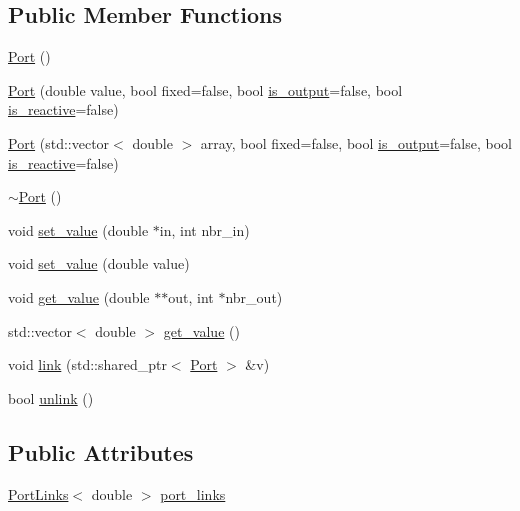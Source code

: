 \subsection*{Public Member Functions}
\begin{DoxyCompactItemize}
\item 
\hyperlink{class_port_a2cfb70a4b6d730e715042d646ec1d960}{Port} ()
\item 
\hyperlink{class_port_abc59e965682f281264a8488a46408a6f}{Port} (double value, bool fixed=false, bool \hyperlink{class_base_port_a79cc42bec526d771d7439a5b3651a5c5}{is\+\_\+output}=false, bool \hyperlink{class_base_port_a186b22bd5b356d06fbf3e6878085c173}{is\+\_\+reactive}=false)
\item 
\hyperlink{class_port_a7eb1db139cc954b15e0d182ad3244067}{Port} (std\+::vector$<$ double $>$ array, bool fixed=false, bool \hyperlink{class_base_port_a79cc42bec526d771d7439a5b3651a5c5}{is\+\_\+output}=false, bool \hyperlink{class_base_port_a186b22bd5b356d06fbf3e6878085c173}{is\+\_\+reactive}=false)
\item 
\hyperlink{class_port_afe166c2a6b10ad34d47472a150366bc1}{$\sim$\+Port} ()
\item 
void \hyperlink{class_port_a18b368a7d48acb802b6671693f54adcb}{set\+\_\+value} (double $\ast$in, int nbr\+\_\+in)
\item 
void \hyperlink{class_port_a28311c7a8fe9e2838aa8ae63a37d2d9a}{set\+\_\+value} (double value)
\item 
void \hyperlink{class_port_acc11e1890530dd4bc0b9e3c7778ef5ff}{get\+\_\+value} (double $\ast$$\ast$out, int $\ast$nbr\+\_\+out)
\item 
std\+::vector$<$ double $>$ \hyperlink{class_port_a82509b87aa9d775d0a40e2b446f2b7ad}{get\+\_\+value} ()
\item 
void \hyperlink{class_port_aec33d8bfca05139b1e319f15d2b3a1b8}{link} (std\+::shared\+\_\+ptr$<$ \hyperlink{class_port}{Port} $>$ \&v)
\item 
bool \hyperlink{class_port_a9a9f8bbbde14187dfb55ef6fbc27492b}{unlink} ()
\end{DoxyCompactItemize}
\subsection*{Public Attributes}
\begin{DoxyCompactItemize}
\item 
\hyperlink{class_port_links}{Port\+Links}$<$ double $>$ \hyperlink{class_port_a7e6cb81c715e20f7432d6c78a9e3c269}{port\+\_\+links}
\end{DoxyCompactItemize}
